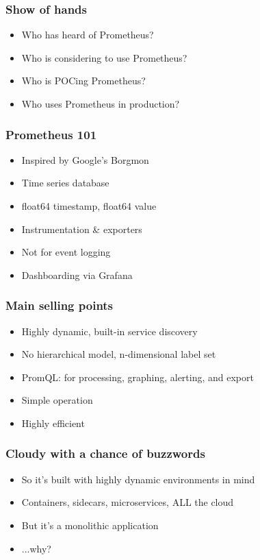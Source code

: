 \documentclass[t]{beamer}
\begin{document}


\begin{frame}
	\frametitle{Show of hands}
	\begin{itemize}
		\item Who has heard of Prometheus?
		\item Who is considering to use Prometheus?
		\item Who is POCing Prometheus?
		\item Who uses Prometheus in production?
	\end{itemize}
\end{frame}

\begin{frame}
	\frametitle{Prometheus 101}
	\begin{itemize}
		\item Inspired by Google's Borgmon
		\item Time series database
		\item float64 timestamp, float64 value
		\item Instrumentation \& exporters
		\item Not for event logging
		\item Dashboarding via Grafana
	\end{itemize}
\end{frame}

\begin{frame}
	\frametitle{Main selling points}
	\begin{itemize}
		\item Highly dynamic, built-in service discovery
		\item No hierarchical model, n-dimensional label set
		\item PromQL: for processing, graphing, alerting, and export
		\item Simple operation
		\item Highly efficient
	\end{itemize}
\end{frame}

\begin{frame}
	\frametitle{Cloudy with a chance of buzzwords}
	\begin{itemize}
		\item So it's built with highly dynamic environments in mind
		\item Containers, sidecars, microservices, ALL the cloud
		\item But it's a monolithic application
		\vfill
		\item ...why?
	\end{itemize}
\end{frame}
\end{document}

